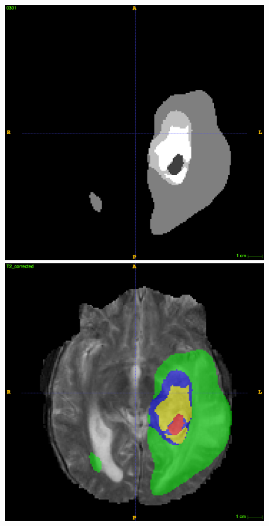 \documentclass[12pt,a4paper,twoside,openright]{report}
\begin{document}
\begin{figure}
	\centering
	\includegraphics[scale = 0.1]{challenge_1_segmentation_66}
	\includegraphics[scale = 0.1]{challenge_1_segmentation_with_T2_66}

\end{figure}
\end{document}
